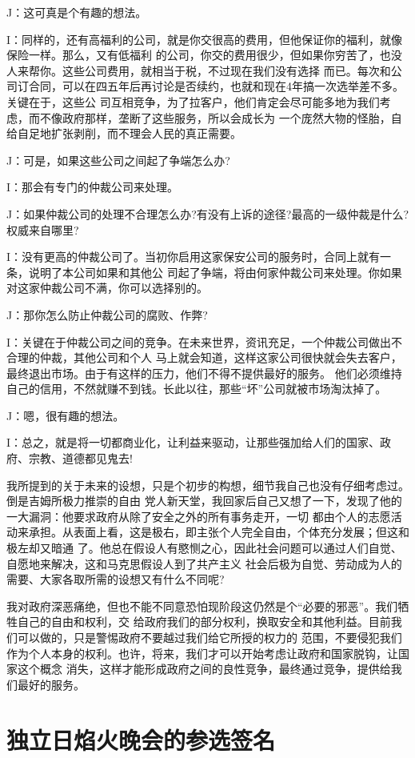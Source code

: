 ﻿\documentclass[11pt]{article}
\begin{document}
J：这可真是个有趣的想法。

I：同样的，还有高福利的公司，就是你交很高的费用，但他保证你的福利，就像保险一样。那么，又有低福利
的公司，你交的费用很少，但如果你穷苦了，也没人来帮你。这些公司费用，就相当于税，不过现在我们没有选择
而已。每次和公司订合同，可以在四五年后再讨论是否续约，也就和现在4年搞一次选举差不多。关键在于，这些公
司互相竞争，为了拉客户，他们肯定会尽可能多地为我们考虑，而不像政府那样，垄断了这些服务，所以会成长为
一个庞然大物的怪胎，自给自足地扩张剥削，而不理会人民的真正需要。

J：可是，如果这些公司之间起了争端怎么办?

I：那会有专门的仲裁公司来处理。

J：如果仲裁公司的处理不合理怎么办?有没有上诉的途径?最高的一级仲裁是什么?权威来自哪里?

I：没有更高的仲裁公司了。当初你启用这家保安公司的服务时，合同上就有一条，说明了本公司如果和其他公
司起了争端，将由何家仲裁公司来处理。你如果对这家仲裁公司不满，你可以选择别的。

J：那你怎么防止仲裁公司的腐败、作弊?

I：关键在于仲裁公司之间的竞争。在未来世界，资讯充足，一个仲裁公司做出不合理的仲裁，其他公司和个人
马上就会知道，这样这家公司很快就会失去客户，最终退出市场。由于有这样的压力，他们不得不提供最好的服务。
他们必须维持自己的信用，不然就赚不到钱。长此以往，那些``坏''公司就被市场淘汰掉了。

J：嗯，很有趣的想法。

I：总之，就是将一切都商业化，让利益来驱动，让那些强加给人们的国家、政府、宗教、道德都见鬼去!

我所提到的关于未来的设想，只是个初步的构想，细节我自己也没有仔细考虑过。倒是吉姆所极力推崇的自由
党人新天堂，我回家后自己又想了一下，发现了他的一大漏洞：他要求政府从除了安全之外的所有事务走开，一切
都由个人的志愿活动来承担。从表面上看，这是极右，即主张个人完全自由，个体充分发展；但这和极左却又暗通
了。他总在假设人有愍恻之心，因此社会问题可以通过人们自觉、自愿地来解决，这和马克思假设人到了共产主义
社会后极为自觉、劳动成为人的需要、大家各取所需的设想又有什么不同呢?

我对政府深恶痛绝，但也不能不同意恐怕现阶段这仍然是个``必要的邪恶''。我们牺牲自己的自由和权利，交
给政府我们的部分权利，换取安全和其他利益。目前我们可以做的，只是警惕政府不要越过我们给它所授的权力的
范围，不要侵犯我们作为个人本身的权利。也许，将来，我们才可以开始考虑让政府和国家脱钩，让国家这个概念
消失，这样才能形成政府之间的良性竞争，最终通过竞争，提供给我们最好的服务。

\section{独立日焰火晚会的参选签名}
\end{document}
